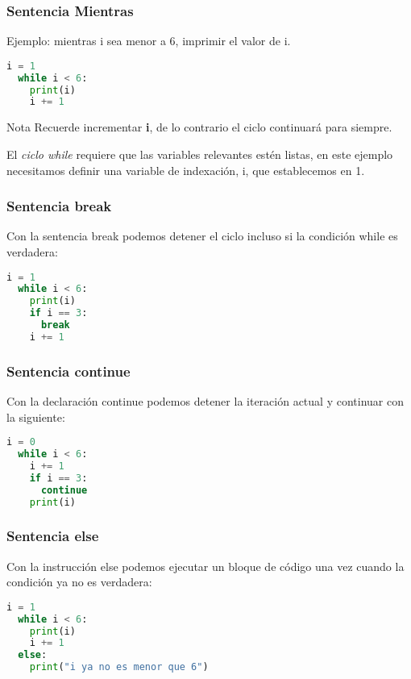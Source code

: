 \begin{frame}[fragile]
  \frametitle{Sentencia Mientras}

  Ejemplo: mientras i sea menor a 6, imprimir el valor de i.

  \vspace{\baselineskip}
  \begin{lstlisting}[language=Python]
  i = 1
  while i < 6:
    print(i)
    i += 1
  \end{lstlisting}

  \pausa
  \begin{alertblock}{Nota}
    Recuerde incrementar \textbf{i}, de lo contrario el ciclo continuará
    para siempre.
  \end{alertblock}

  El \emph{ciclo while} requiere que las variables relevantes estén listas,
  en este ejemplo necesitamos definir una variable de indexación, i,
  que establecemos en 1.
\end{frame}

\begin{frame}[fragile]
  \frametitle{Sentencia \textbf{break}}

  Con la sentencia \textcolor{codeKeyword}{break} podemos detener el ciclo incluso si la
  condición while es verdadera:

  \vspace{\baselineskip}
  \begin{lstlisting}[language=Python]
  i = 1
  while i < 6:
    print(i)
    if i == 3:
      break
    i += 1
  \end{lstlisting}
\end{frame}

\begin{frame}[fragile]
  \frametitle{Sentencia \textbf{continue}}

  Con la declaración \textcolor{codeKeyword}{continue} podemos detener la iteración actual
  y continuar con la siguiente:

  \vspace{\baselineskip}
  \begin{lstlisting}[language=Python]
  i = 0
  while i < 6:
    i += 1
    if i == 3:
      continue
    print(i)
  \end{lstlisting}
\end{frame}

\begin{frame}[fragile]
  \frametitle{Sentencia \textbf{else}}

  Con la instrucción \textcolor{codeKeyword}{else} podemos ejecutar un bloque de código
  una vez cuando la condición ya no es verdadera:

  \vspace{\baselineskip}
  \begin{lstlisting}[language=Python]
  i = 1
  while i < 6:
    print(i)
    i += 1
  else:
    print("i ya no es menor que 6")
  \end{lstlisting}
\end{frame}

